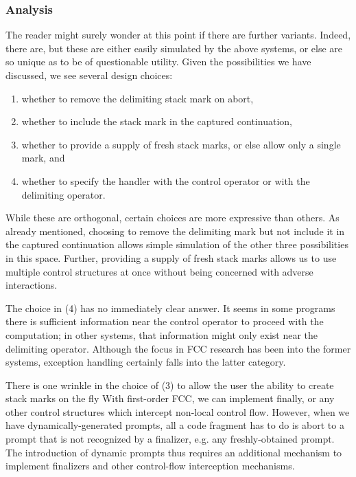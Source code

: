\documentclass[11pt]{article}
\newcommand{\maybePage}{\newpage}
\begin{document}
\maybePage
\subsubsection{Analysis}
\label{subsubsec:delimControlAnalysis}

The reader might surely wonder at this point if there are further variants.
Indeed, there are, but these are either easily simulated by the above systems, or else are so unique as to be of questionable utility.
Given the possibilities we have discussed, we see several design choices:
\begin{enumerate}
\item whether to remove the delimiting stack mark on abort,
\item whether to include the stack mark in the captured continuation,
\item whether to provide a supply of fresh stack marks, or else allow only a single mark, and
\item whether to specify the handler with the control operator or with the delimiting operator.
\end{enumerate}
While these are orthogonal, certain choices are more expressive than others.
As already mentioned, choosing to remove the delimiting mark but not include it in the captured continuation allows simple simulation of the other three possibilities in this space.
Further, providing a supply of fresh stack marks allows us to use multiple control structures at once without being concerned with adverse interactions.

The choice in (4) has no immediately clear answer.
It seems in some programs there is sufficient information near the control operator to proceed with the computation; in other systems, that information might only exist near the delimiting operator.
Although the focus in FCC research has been into the former systems, exception handling certainly falls into the latter category.

There is one wrinkle in the choice of (3) to allow the user the ability to create stack marks on the fly
With first-order FCC, we can implement finally, or any other control structures which intercept non-local control flow.
However, when we have dynamically-generated prompts, all a code fragment has to do is abort to a prompt that is not recognized by a finalizer, e.g. any freshly-obtained prompt.
The introduction of dynamic prompts thus requires an additional mechanism to implement finalizers and other control-flow interception mechanisms.
\end{document}
